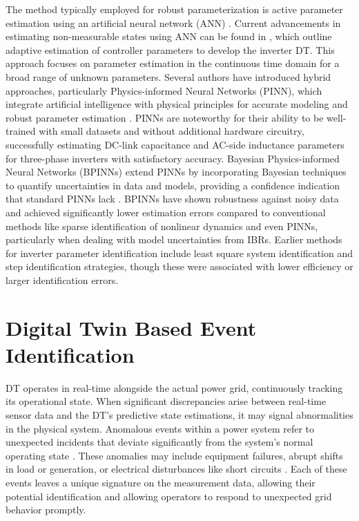 The method typically employed for robust parameterization is active parameter estimation using an artificial neural network (ANN) \autocite{1224042}. Current advancements in estimating non-measurable states using ANN can be found in \autocite{Song2019,AhmedAli01082007}, which outline adaptive estimation of controller parameters to develop the inverter DT. This approach focuses on parameter estimation in the continuous time domain for a broad range of unknown parameters. Several authors have introduced hybrid approaches, particularly Physics-informed Neural Networks (PINN), which integrate artificial intelligence with physical principles for accurate modeling and robust parameter estimation \autocite{10567996}. PINNs are noteworthy for their ability to be well-trained with small datasets and without additional hardware circuitry, successfully estimating DC-link capacitance and AC-side inductance parameters for three-phase inverters with satisfactory accuracy. Bayesian Physics-informed Neural Networks (BPINNs) extend PINNs by incorporating Bayesian techniques to quantify uncertainties in data and models, providing a confidence indication that standard PINNs lack \autocite{STOCK2024110860}. BPINNs have shown robustness against noisy data and achieved significantly lower estimation errors compared to conventional methods like sparse identification of nonlinear dynamics and even PINNs, particularly when dealing with model uncertainties from IBRs. Earlier methods for inverter parameter identification include least square system identification and step identification strategies, though these were associated with lower efficiency or larger identification errors.


\section{Digital Twin Based Event Identification}\label{sec:ch2/sec3}

DT operates in real-time alongside the actual power grid, continuously tracking its operational state. When significant discrepancies arise between real-time sensor data and the DT’s predictive state estimations, it may signal abnormalities in the physical system. Anomalous events within a power system refer to unexpected incidents that deviate significantly from the system’s normal operating state \autocite{ASEFI2023101116, ZANG2025110813}. These anomalies may include equipment failures, abrupt shifts in load or generation, or electrical disturbances like short circuits \autocite{Li_2021}. Each of these events leaves a unique signature on the measurement data, allowing their potential identification and allowing operators to respond to unexpected grid behavior promptly. 

